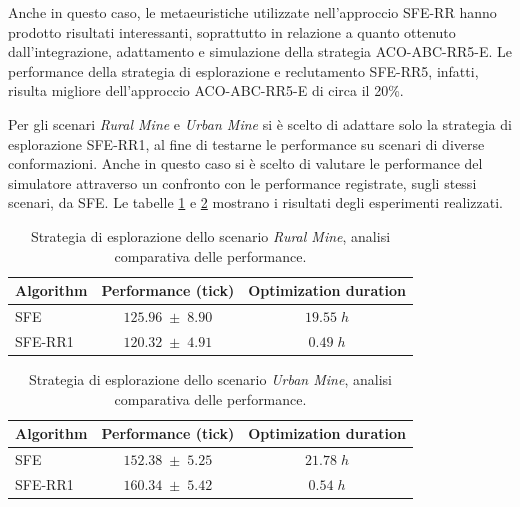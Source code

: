 Anche in questo caso, le metaeuristiche utilizzate nell'approccio SFE-RR hanno prodotto risultati interessanti, soprattutto in relazione a quanto ottenuto dall'integrazione, adattamento e simulazione della strategia ACO-ABC-RR5-E.
Le performance della strategia di esplorazione e reclutamento SFE-RR5, infatti, risulta migliore dell'approccio ACO-ABC-RR5-E di circa il 20\%.

Per gli scenari \textit{Rural Mine} e \textit{Urban Mine} si è scelto di adattare solo la strategia di esplorazione SFE-RR1, al fine di testarne le performance su scenari di diverse conformazioni.
Anche in questo caso si è scelto di valutare le performance del simulatore attraverso un confronto con le performance registrate, sugli stessi scenari, da SFE.
Le tabelle \ref{analisi_comparativa_esplorazione_ruralMine} e \ref{analisi_comparativa_esplorazione_urbanMine} mostrano i risultati degli esperimenti realizzati.

\begin{table}[H]
    \centering
    \captionsetup{justification=centering, margin=2cm, font=footnotesize}
    \begin{tabular}{|l|c|c|}
    \hline
    \textbf{Algorithm}              & \textbf{Performance (tick)}       & \textbf{Optimization duration}      \\ \hline
    SFE                             & $125.96 \; \pm \; 8.90$           &$19.55 \; h$       \\ \hline
    SFE-RR1                         & $120.32 \; \pm \; 4.91$           &$0.49  \; h$       \\ \hline
    \end{tabular}%
    
    \caption{Strategia di esplorazione dello scenario \textit{Rural Mine}, analisi comparativa delle performance.}
    \label{analisi_comparativa_esplorazione_ruralMine}
\end{table}

\begin{table}[H]
    \centering
    \captionsetup{justification=centering, margin=2cm, font=footnotesize}
    \begin{tabular}{|l|c|c|}
    \hline
    \textbf{Algorithm}              & \textbf{Performance (tick)}       & \textbf{Optimization duration}      \\ \hline
    SFE                             & $152.38 \; \pm \; 5.25$           &$21.78 \; h$       \\ \hline
    SFE-RR1                         & $160.34 \; \pm \; 5.42$           &$0.54  \; h$       \\ \hline
    \end{tabular}%
    
    \caption{Strategia di esplorazione dello scenario \textit{Urban Mine}, analisi comparativa delle performance.}
    \label{analisi_comparativa_esplorazione_urbanMine}
\end{table}

